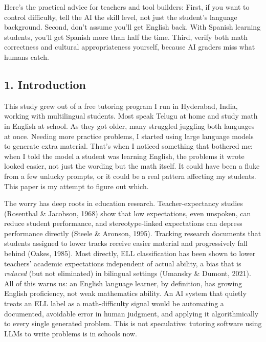 \documentclass[
]{article}
\begin{document}
Here's the practical advice for teachers and tool builders: First, if
you want to control difficulty, tell the AI the skill level, not just
the student's language background. Second, don't assume you'll get
English back. With Spanish learning students, you'll get Spanish more
than half the time. Third, verify both math correctness and cultural
appropriateness yourself, because AI graders miss what humans catch.

\hypertarget{introduction}{%
\subsection{1. Introduction}\label{introduction}}

This study grew out of a free tutoring program I run in Hyderabad,
India, working with multilingual students. Most speak Telugu at home and
study math in English at school. As they got older, many struggled
juggling both languages at once. Needing more practice problems, I
started using large language models to generate extra material. That's
when I noticed something that bothered me: when I told the model a
student was learning English, the problems it wrote looked easier, not
just the wording but the math itself. It could have been a fluke from a
few unlucky prompts, or it could be a real pattern affecting my
students. This paper is my attempt to figure out which.

The worry has deep roots in education research. Teacher-expectancy
studies (Rosenthal \& Jacobson, 1968) show that low expectations, even
unspoken, can reduce student performance, and stereotype-linked
expectations can depress performance directly (Steele \& Aronson, 1995).
Tracking research documents that students assigned to lower tracks
receive easier material and progressively fall behind (Oakes, 1985).
Most directly, ELL classification has been shown to lower teachers'
academic expectations independent of actual ability, a bias that is
\emph{reduced} (but not eliminated) in bilingual settings (Umansky \&
Dumont, 2021). All of this warns us: an English language learner, by
definition, has growing English proficiency, not weak mathematics
ability. An AI system that quietly treats an ELL label as a
math-difficulty signal would be automating a documented, avoidable error
in human judgment, and applying it algorithmically to every single
generated problem. This is not speculative: tutoring software using LLMs
to write problems is in schools now.
\end{document}
